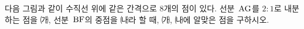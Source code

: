 \noindent\begin{minipage}[t]{0.58\linewidth}\vspace{0pt}다음 그림과 같이 수직선 위에 같은 간격으로 8개의 점이 있다. 선분~$\mathrm{AG}$를 $2:1$로 내분하는 점을 ㈎, 선분~$\mathrm{BF}$의 중점을 ㈏라 할 때, ㈎, ㈏에 알맞은 점을 구하시오.\end{minipage}\hfill\begin{minipage}[t]{0.4\linewidth}\vspace{0pt}\centering \end{minipage}\par
